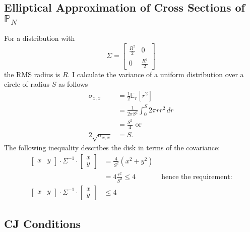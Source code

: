 \documentclass[]{article}
\newcommand{\field}[1]{\mathbb{#1}}
\newcommand\Polytope[1]{\field{P}_{#1}}
\newcommand\PolytopeN{\Polytope{N}}
\newcommand{\EV}[2]{\field{E}_{#1}\left[#2\right]}
\begin{document}
\subsection{Elliptical Approximation of Cross Sections of
  $\PolytopeN$}
\label{sec:ellipse}
For a distribution with
\begin{equation*}
  \Sigma = \begin{bmatrix} \frac{R^2}{2} &0 \\ 0 &
    \frac{R^2}{2} \end{bmatrix} 
\end{equation*}
the RMS radius is $R$.  I calculate the variance of a uniform
distribution over a circle of radius $S$ as follows
\begin{align*}
  \sigma_{x,x} &= \frac{1}{2} \EV{r}{r^2} \\
  &= \frac{1}{2\pi S^2} \int_0^S 2\pi r r^2 \, dr \\
  &= \frac{S^2}{4} \text{ or}\\
  2\sqrt{\sigma_{x,x}} &= S.
\end{align*}
The following inequality describes the disk in terms of the covariance:
\begin{align*}
  \begin{bmatrix} x & y \end{bmatrix} \cdot \Sigma^{-1}
  \cdot \begin{bmatrix} x\\y \end{bmatrix} &= \frac{4}{S^2} 
  \left( x^2 + y^2 \right) \\
  &= 4 \frac{r^2}{S^2} \leq 4 &\text{ hence the requirement:} \\
  \begin{bmatrix} x & y \end{bmatrix} \cdot \Sigma^{-1}
  \cdot \begin{bmatrix} x\\y \end{bmatrix} &\leq 4  
\end{align*}

\subsection{CJ Conditions}
\label{sec:CJ}
\end{document}
